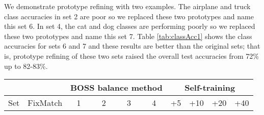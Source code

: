 \documentclass[final]{cvpr}
\begin{document}
We demonstrate prototype refining with two examples.  
The airplane and truck class accuracies in set 2 are poor so we replaced these two prototypes and name this set 6.
In set 4, the cat and dog classes are performing poorly so we replaced these two prototypes and name this set 7.
Table \ref{tab:classAcc1} shows the class accuracies for sets 6 and 7 and these results are better than the original sets; that is, prototype refining of these two sets raised the overall test accuracies from 72\% up to 82-83\%.






\begin{table*}
	\begin{center}
		\begin{tabular}{|c|c|c|c|c|c|c|c|c|c|}
			\hline
			&  & \multicolumn{4}{|c|}{BOSS balance method} & \multicolumn{4}{|c|}{Self-training}    \\
			\hline
			Set  & FixMatch & 1 & 2 & 3 & 4 & +5 & +10 & +20 & +40    \\
			

\end{tabular}
\end{center}
\end{table*}
\end{document}
